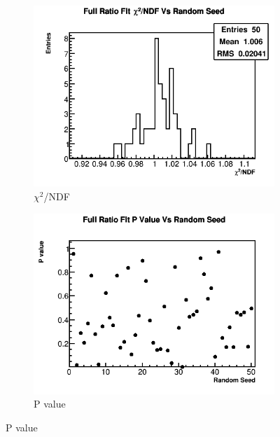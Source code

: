 		\begin{figure}[]
		\centering
		    \begin{subfigure}[t]{0.45\textwidth}
			    \centering
				\includegraphics[width=\textwidth]{RatioCBO_Chi2NDF_Vs_Iter_Canv_hist}
			    \caption{$\chi^{2}$/NDF}
		    \end{subfigure}
		    \hspace{4mm}
		    \begin{subfigure}[t]{0.45\textwidth}
			    \centering
				\includegraphics[width=\textwidth]{RatioCBO_PVal_Vs_Iter_Canv}
			    \caption{P value}
		    \end{subfigure}%
		   	\vspace{4mm}

\end{figure}
